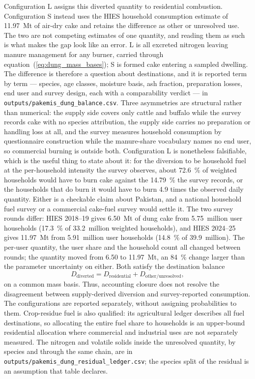 \documentclass[essd]{copernicus}
\begin{document}
Configuration L assigns this diverted quantity to residential combustion. Configuration S instead uses the HIES household consumption estimate of 11.97~Mt of air-dry cake and retains the difference as other or unresolved use. The two are not competing estimates of one quantity, and reading them as such is what makes the gap look like an error. L is all excreted nitrogen leaving manure management for any burner, carried through equation~(\ref{eq:dung_mass_bases}); S is formed cake entering a sampled dwelling. The difference is therefore a question about destinations, and it is reported term by term --- species, age classes, moisture basis, ash fraction, preparation losses, end user and survey design, each with a comparability verdict --- in \texttt{outputs/pakemis\_dung\_balance.csv}. Three asymmetries are structural rather than numerical: the supply side covers only cattle and buffalo while the survey records cake with no species attribution, the supply side carries no preparation or handling loss at all, and the survey measures household consumption by questionnaire construction while the manure-share vocabulary names no end user, so commercial burning is outside both. Configuration L is nonetheless falsifiable, which is the useful thing to state about it: for the diversion to be household fuel at the per-household intensity the survey observes, about \SI{72.6}{\percent} of weighted households would have to burn cake against the \SI{14.79}{\percent} the survey records, or the households that do burn it would have to burn \num{4.9} times the observed daily quantity. Either is a checkable claim about Pakistan, and a national household fuel survey or a commercial cake-fuel survey would settle it. The two survey rounds differ: HIES 2018--19 gives 6.50~Mt of dung cake from 5.75~million user households (\SI{17.3}{\percent} of 33.2~million weighted households), and HIES 2024--25 gives 11.97~Mt from 5.91~million user households (\SI{14.8}{\percent} of 39.9~million). The per-user quantity, the user share and the household count all changed between rounds; the quantity moved from 6.50 to 11.97~Mt, an \SI{84}{\percent} change larger than the parameter uncertainty on either. Both satisfy the destination balance
\begin{equation}
 D_{\mathrm{diverted}}=D_{\mathrm{residential}}
 +D_{\mathrm{other/unresolved}},
 \label{eq:dung_destination}
\end{equation}
on a common mass basis. Thus, accounting closure does not resolve the disagreement between supply-derived diversion and survey-reported consumption. The configurations are reported separately, without assigning probabilities to them. Crop-residue fuel is also qualified: its agricultural ledger describes all fuel destinations, so allocating the entire fuel share to households is an upper-bound residential allocation where commercial and industrial uses are not separately measured. The nitrogen and volatile solids inside the unresolved quantity, by species and through the same chain, are in \texttt{outputs/pakemis\_dung\_residual\_ledger.csv}; the species split of the residual is an assumption that table declares.
\end{document}
